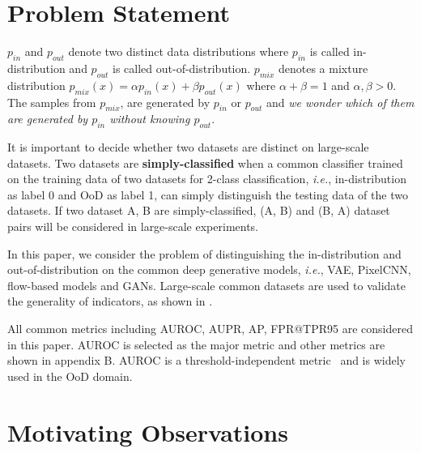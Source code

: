 \documentclass[letterpaper]{article} %
\newcommand{\IE}{\textit{i.e.}, }
\newcommand{\pin}{p_{in}}
\newcommand{\pout}{p_{out}}
\newcommand{\pmix}{p_{mix}}
\begin{document}
\section{Problem Statement}\label{sec2}

$\pin$ and $\pout$ denote two distinct data distributions where $\pin$ is called in-distribution and $\pout$ is called out-of-distribution. 
$\pmix$ denotes a mixture distribution $\pmix(x) = \alpha \pin(x) + \beta \pout(x)$ where $\alpha + \beta = 1$ and $\alpha, \beta > 0$. 
The samples from $\pmix$, are generated by $\pin$ or $\pout$ and \textit{we wonder which of them are generated by $\pin$ without knowing $\pout$}. 

It is important to decide whether two datasets are distinct on large-scale datasets. Two datasets are \textbf{simply-classified} when a common classifier trained on the training data of two datasets for 2-class classification, \IE in-distribution as label 0 and OoD as label 1, can simply distinguish the testing data of the two datasets. If two dataset A, B are simply-classified, (A, B) and (B, A) dataset pairs will be considered in large-scale experiments. 

In this paper, we consider the problem of distinguishing the in-distribution and out-of-distribution on the common deep generative models, \IE VAE, PixelCNN, flow-based models and GANs. Large-scale common datasets are used to validate the generality of indicators, as shown in . 

All common metrics including AUROC, AUPR, AP, FPR@TPR95 are considered in this paper. AUROC is selected as the major metric and other metrics are shown in appendix B. AUROC is a threshold-independent metric~\cite{davis2006relationship} and is widely used in the OoD domain. %

\section{Motivating Observations}\label{sec3}
\end{document}
